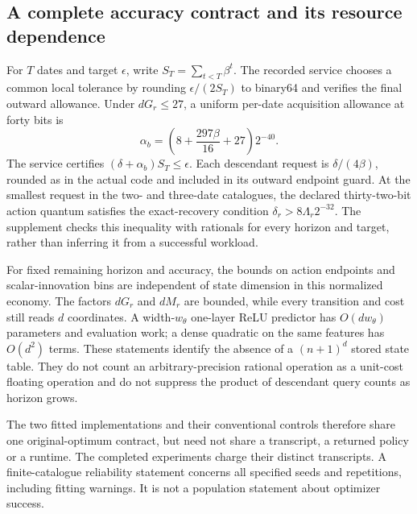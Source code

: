 \subsection{A complete accuracy contract and its resource dependence}
For $T$ dates and target $\epsilon$, write $S_T=\sum_{t<T}\beta^t$. The recorded service chooses a common local tolerance by rounding $\epsilon/(2S_T)$ to binary64 and verifies the final outward allowance. Under $dG_r\le27$, a uniform per-date acquisition allowance at forty bits is
\[
 \alpha_b=\left(8+\frac{297\beta}{16}+27\right)2^{-40}.
\]
The service certifies $(\delta+\alpha_b)S_T\le\epsilon$. Each descendant request is $\delta/(4\beta)$, rounded as in the actual code and included in its outward endpoint guard. At the smallest request in the two- and three-date catalogues, the declared thirty-two-bit action quantum satisfies the exact-recovery condition $\delta_r>8\Lambda_r2^{-32}$. The supplement checks this inequality with rationals for every horizon and target, rather than inferring it from a successful workload.

For fixed remaining horizon and accuracy, the bounds on action endpoints and scalar-innovation bins are independent of state dimension in this normalized economy. The factors $dG_r$ and $dM_r$ are bounded, while every transition and cost still reads $d$ coordinates. A width-$w_\theta$ one-layer ReLU predictor has $O(dw_\theta)$ parameters and evaluation work; a dense quadratic on the same features has $O(d^2)$ terms. These statements identify the absence of a $(n+1)^d$ stored state table. They do not count an arbitrary-precision rational operation as a unit-cost floating operation and do not suppress the product of descendant query counts as horizon grows.

The two fitted implementations and their conventional controls therefore share one original-optimum contract, but need not share a transcript, a returned policy or a runtime. The completed experiments charge their distinct transcripts. A finite-catalogue reliability statement concerns all specified seeds and repetitions, including fitting warnings. It is not a population statement about optimizer success.
